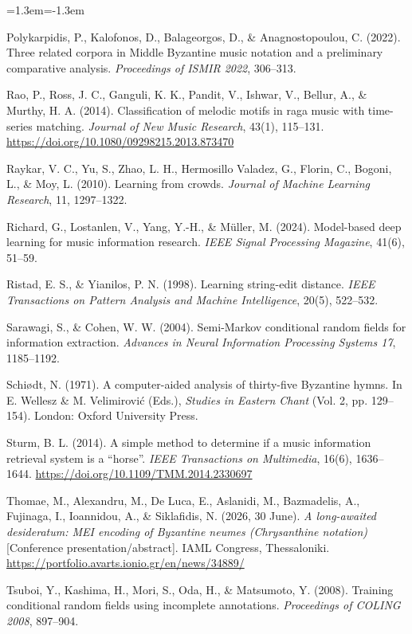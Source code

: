 \documentclass[a4paper]{article}
\newenvironment{reflist}{\begin{list}{}{\leftmargin=1.3em\itemindent=-1.3em\itemsep=0pt\parsep=0pt}\fontsize{9}{9.5}\selectfont}{\end{list}}
\begin{document}
\begin{reflist}
\item Polykarpidis, P., Kalofonos, D., Balageorgos, D., \& Anagnostopoulou, C. (2022). Three related corpora in Middle Byzantine music notation and a preliminary comparative analysis. \emph{Proceedings of ISMIR 2022}, 306--313.
\item Rao, P., Ross, J. C., Ganguli, K. K., Pandit, V., Ishwar, V., Bellur, A., \& Murthy, H. A. (2014). Classification of melodic motifs in raga music with time-series matching. \emph{Journal of New Music Research}, 43(1), 115--131. \url{https://doi.org/10.1080/09298215.2013.873470}
\item Raykar, V. C., Yu, S., Zhao, L. H., Hermosillo Valadez, G., Florin, C., Bogoni, L., \& Moy, L. (2010). Learning from crowds. \emph{Journal of Machine Learning Research}, 11, 1297--1322.
\item Richard, G., Lostanlen, V., Yang, Y.-H., \& Müller, M. (2024). Model-based deep learning for music information research. \emph{IEEE Signal Processing Magazine}, 41(6), 51--59.
\item Ristad, E. S., \& Yianilos, P. N. (1998). Learning string-edit distance. \emph{IEEE Transactions on Pattern Analysis and Machine Intelligence}, 20(5), 522--532.
\item Sarawagi, S., \& Cohen, W. W. (2004). Semi-Markov conditional random fields for information extraction. \emph{Advances in Neural Information Processing Systems 17}, 1185--1192.
\item Schiødt, N. (1971). A computer-aided analysis of thirty-five Byzantine hymns. In E. Wellesz \& M. Velimirović (Eds.), \emph{Studies in Eastern Chant} (Vol. 2, pp. 129--154). London: Oxford University Press.
\item Sturm, B. L. (2014). A simple method to determine if a music information retrieval system is a ``horse''. \emph{IEEE Transactions on Multimedia}, 16(6), 1636--1644. \url{https://doi.org/10.1109/TMM.2014.2330697}
\item Thomae, M., Alexandru, M., De Luca, E., Aslanidi, M., Bazmadelis, A., Fujinaga, I., Ioannidou, A., \& Siklafidis, N. (2026, 30 June). \emph{A long-awaited desideratum: MEI encoding of Byzantine neumes (Chrysanthine notation)} [Conference presentation/abstract]. IAML Congress, Thessaloniki. \url{https://portfolio.avarts.ionio.gr/en/news/34889/}
\item Tsuboi, Y., Kashima, H., Mori, S., Oda, H., \& Matsumoto, Y. (2008). Training conditional random fields using incomplete annotations. \emph{Proceedings of COLING 2008}, 897--904.

\end{reflist}
\end{document}
